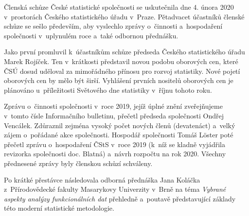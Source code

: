 
\gdef\mujnazevCS{Členská schůze České statistické společnosti v~roce 2020}

\gdef\mujnazevEN{ANNUAL MEMBERS' MEETING OF THE CZECH STATISTICAL SOCIETY IN 2020}

\gdef\mujnazevPR{\mujnazevCS}
\gdef\mujnazevDR{\mujnazevEN}

\gdef\mujauthor{Ondřej Vencálek}
\author{\mujauthor}



\medskip

\noindent
Členská schůze České statistické společnosti se uskutečnila dne 4. února 2020 v prostorách Českého statistického úřadu v~Praze. Pětadvacet účastníků členské schůze se sešlo především, aby vyslechlo zprávy o~činnosti a~hospodaření společnosti v uplynulém roce a~také odbornou přednášku. 

Jako první promluvil k účastníkům schůze předseda Českého statistického úřadu Marek Rojíček. Ten v krátkosti představil novou podobu oborových cen, které ČSÚ dosud uděloval za mimořádného přínosu pro rozvoj statistiky. Nové pojetí oborových cen by mělo být širší. Vyhlášení prvních nositelů oborových cen je plánováno u~příležitosti Světového dne statistiky v říjnu tohoto roku.

Zprávu o~činnosti společnosti v~roce 2019, jejíž úplné znění zveřejňujeme v tomto čísle Informačního bulletinu, přečetl předseda společnosti Ondřej Vencálek. Zdůraznil zejména vysoký počet nových členů (devatenáct) a~velký zájem o~pořádané akce společnosti. Hospodář společnosti Tomáš Löster poté přečetl zprávu o~hospodaření ČStS v~roce 2019 (k~níž se kladně vyjádřila revizorka společnosti doc. Blatná) a~návrh rozpočtu na rok 2020. Všechny přednesené zprávy byly členskou schůzí schváleny.

Po krátké přestávce následovala odborná přednáška Jana Koláčka z Přírodovědecké fakulty Masarykovy Univerzity v~Brně na téma \textit{Vybrané aspekty analýzy funkcionálních dat} přehledně a~poutavě představující základy této moderní statistické metodologie. 


